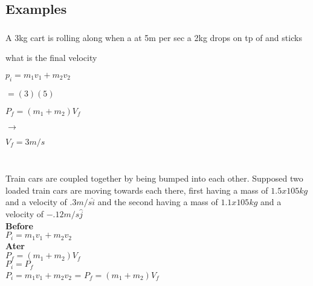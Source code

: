 \documentclass{article}
\begin{document}
\pagebreak


 
\subsection{\huge \centering Examples}
\hrulefill
\centering
\subsubsection{}
\hrulefill

A 3kg cart is rolling along when a at 5m per sec a 2kg drops on tp of and sticks

what is the final velocity 

$p_i = m_1v_1 +m_2v_2$

$=(3)(5)$

$P_f = (m_1+ m_2) V_f$

$\rightarrow$

$V_f = 3m/s$ \\[30pt]


\hrulefill
\subsubsection{}
\hrulefill \\[15pt]

Train cars are coupled together by being bumped into each other. Supposed two loaded train cars are moving towards each there, first having a mass of $1.5 x 105kg$ and a velocity of $.3m/s \hat{i}$ and the second having a mass of $1.1x105kg$ and a velocity of $-.12m/s \hat{j}$\\[20pt]

\textbf{\large Before}\\
$P_i = m_1v_1 +m_2v_2$\\[15pt]

\textbf{\large Ater}\\
$P_f = (m_1+ m_2) V_f$\\[15pt]

$P_i = P_f$\\[15pt]

$P_i = m_1v_1 +m_2v_2$ = $P_f = (m_1+ m_2) V_f$\\[15pt]
\end{document}
